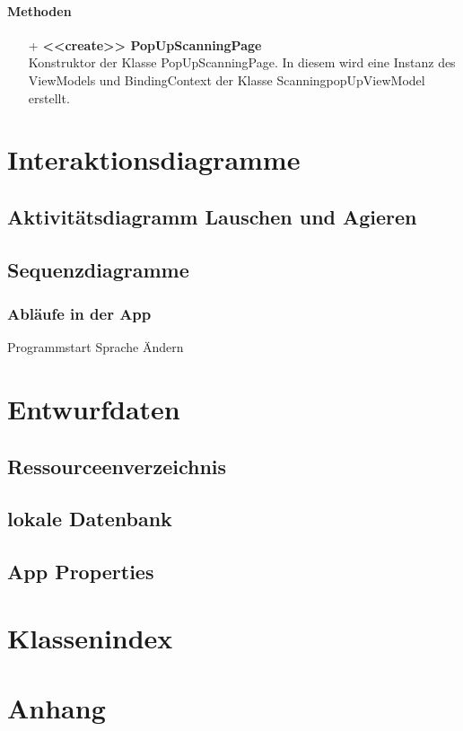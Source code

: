 \documentclass[a4paper,12pt]{article}
\begin{document}
		\paragraph{Methoden}
		\begin{itemize}
		\item[+] \textbf{<<create>> PopUpScanningPage}\\Konstruktor der Klasse PopUpScanningPage. In diesem wird eine Instanz des ViewModels und BindingContext der Klasse ScanningpopUpViewModel erstellt.
		\end{itemize}

\section{Interaktionsdiagramme}
\subsection{Aktivitätsdiagramm Lauschen und Agieren}
\subsection{Sequenzdiagramme}
\subsubsection{Abläufe in der App}
Programmstart
Sprache Ändern
\section{Entwurfdaten}
\subsection{Ressourceenverzeichnis}
\subsection{lokale Datenbank}
\subsection{App Properties}

\section{Klassenindex}
\section{Anhang}

\clearpage
\printglossaries
{}
\end{document}
